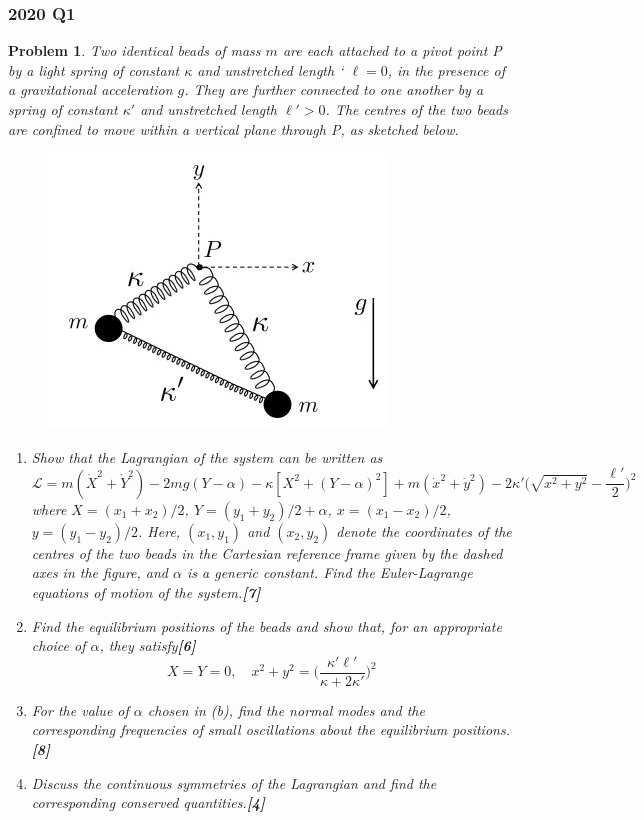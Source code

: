 \documentclass[a4paper]{article}
\theoremstyle{new}
\newtheorem{qns}{Problem}[section]
\begin{document}
\subsubsection*{2020 Q1}
\begin{qns}
Two identical beads of mass $m$ are each attached to a pivot point P by a light spring of constant $\kappa$ and unstretched length ` $\ell= 0$, in the presence of a gravitational acceleration $g$. They are further connected to one another by a spring of constant $\kappa'$ and unstretched length $\ell'>0$. The centres of the two beads are confined to move within a vertical plane through P, as sketched below.
\begin{figure}[H]
    \centering
    \includegraphics[scale=0.75]{2020TP1Q1.JPG}
\end{figure}
\begin{enumerate}[label=(\alph*)]
\item Show that the Lagrangian of the system can be written as
$$\mathcal{L}=m(\dot{X}^2+\dot{Y}^2)-2mg(Y-\alpha)-\kappa[X^2+(Y-\alpha)^2]+m(\dot{x}^2+\dot{y}^2)-2\kappa'\bigg(\sqrt{x^2+y^2}-\frac{\ell'}{2}\bigg)^2$$
where $X = (x_1 + x_2)/2$, $Y = (y_1 + y_2)/2 + \alpha$, $x = (x_1 − x_2)/2$, $y = (y_1 − y_2)/2$. Here, $(x_1, y_1)$ and $(x_2, y_2)$ denote the coordinates of the centres of the two beads in the Cartesian reference frame given by the dashed axes in the figure, and $\alpha$ is a generic constant. Find the Euler-Lagrange equations of motion of the system.\hfill\textbf{[7]}
\item Find the equilibrium positions of the beads and show that, for an appropriate choice of $\alpha$, they satisfy\hfill\textbf{[6]}
$$X=Y=0,\quad x^2+y^2=\bigg(\frac{\kappa'\ell'}{\kappa+2\kappa'}\bigg)^2$$
\item For the value of $\alpha$ chosen in (b), find the normal modes and the corresponding frequencies of small oscillations about the equilibrium positions.\hfill\textbf{[8]}
\item Discuss the continuous symmetries of the Lagrangian and find the corresponding conserved quantities.\hfill\textbf{[4]}
\end{enumerate}
\end{qns}
\end{document}
